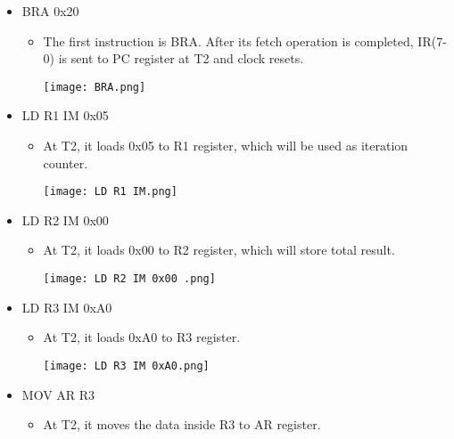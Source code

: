 \documentclass[pdftex,12pt,a4paper]{article}
\begin{document}
\begin{itemize}
    \item BRA 0x20
    \begin{itemize}
       \item The first instruction is BRA. After its fetch operation is completed, IR(7-0) is sent to PC register at T2 and clock resets.
        \begin{center}
            \texttt{[image: BRA.png]}	\newline
        \end{center}
    \end{itemize} 
    \item LD R1 IM 0x05
    \begin{itemize}
        \item At T2, it loads 0x05 to R1 register, which will be used as iteration counter.
        \begin{center}
            \texttt{[image: LD R1 IM.png]}	\newline
        	\label{fig1}
        \end{center}
    \end{itemize}
    \item LD R2 IM 0x00
    \begin{itemize}
        \item At T2, it loads 0x00 to R2 register, which will store total result.
        \begin{center}
            \texttt{[image: LD R2 IM 0x00 .png]}\newline
        	\label{fig1}
        \end{center}
    \end{itemize}
    \item LD R3 IM 0xA0
    \begin{itemize}
        \item At T2, it loads 0xA0 to R3 register.
        \begin{center}
            \texttt{[image: LD R3 IM 0xA0.png]}\newline
        	\label{fig1}
        \end{center}
    \end{itemize}
    \item MOV AR R3
    \begin{itemize}
        \item At T2, it moves the data inside R3 to AR register.
        \begin{center}

\end{center}
\end{itemize}
\end{itemize}
\end{document}
